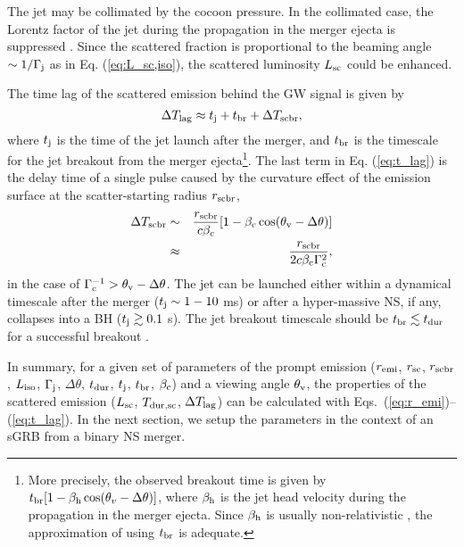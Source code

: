 \documentclass{emulateapj}
\begin{document}
The jet may be collimated by the cocoon pressure. 
In the collimated case, the Lorentz factor of the jet during the propagation in the merger ejecta is suppressed 
\citep[e.g., ][]{2011ApJ...740..100B, 2013ApJ...777..162M}. 
Since the scattered fraction is proportional to the beaming angle $\sim1/\Gamma_{\rm j}$ as in Eq. (\ref{eq:L_sc,iso}), 
the scattered luminosity $L_{\rm sc}$ could be enhanced. 

The time lag of the scattered emission behind the GW signal is given by
\begin{equation}\label{eq:t_lag}
\Delta T_{\rm lag} \approx t_{\rm j}+t_{\rm br}+\Delta T_{\rm scbr},
\end{equation} 
where $t_{\rm j}$ is the time of the jet launch after the merger,
and $t_{\rm br}$ is the timescale for the jet breakout from the merger ejecta\footnote{
More precisely, the observed breakout time is given by
$t_{\rm br}[1-\beta_{\rm h}\cos(\theta_v-\Delta\theta)]$,
where $\beta_{\rm h}$ is the jet head velocity during the propagation in the merger ejecta.
Since $\beta_{\rm h}$ is usually non-relativistic \citep{2017arXiv171005905I},
the approximation of using $t_{\rm br}$ is adequate.
}.
The last term in Eq. (\ref{eq:t_lag}) is the delay time of a single pulse 
caused by the curvature effect of the emission surface 
at the scatter-starting radius $r_{\rm scbr}$, %
\begin{eqnarray}\label{eq:T_scbr}
\Delta T_{\rm scbr}&\sim& \frac{r_{\rm scbr}}{c\beta_c}[1-\beta_{\rm c}\cos(\theta_{\rm v}-\Delta\theta)] \nonumber \\
&\approx& \frac{r_{\rm scbr}}{2c\beta_{\rm c}\Gamma_{\rm c}^2},
\end{eqnarray}
in the case of $\Gamma_{\rm c}^{-1}>\theta_{\rm v}-\Delta\theta$.
The jet can be launched either within a dynamical timescale after the merger
($t_{\rm j}\sim1-10$ ms) or after a hyper-massive NS, if any, collapses into a BH 
($t_{\rm j}\gtrsim 0.1$ s).
The jet breakout timescale should be $t_{\rm br}\lesssim t_{\rm dur}$ for a successful breakout \citep{2014ApJ...784L..28N}.

In summary, for a given set of parameters of the prompt emission 
($r_{\rm emi}$, $r_{\rm sc}$, $r_{\rm scbr}$, $L_{\rm iso}$, $\Gamma_{\rm j}$, 
$\Delta\theta$, $t_{\rm dur}$, $t_{\rm j}$, $t_{\rm br}$, $\beta_{\rm c}$) 
and a viewing angle $\theta_{\rm v}$, 
the properties of the scattered emission ($L_{\rm sc}$, $T_{\rm dur, sc}$, $\Delta T_{\rm lag}$) 
can be calculated with Eqs.~(\ref{eq:r_emi})--(\ref{eq:t_lag}).
In the next section,
we setup the parameters in the context of an sGRB from a binary NS merger.
\end{document}
